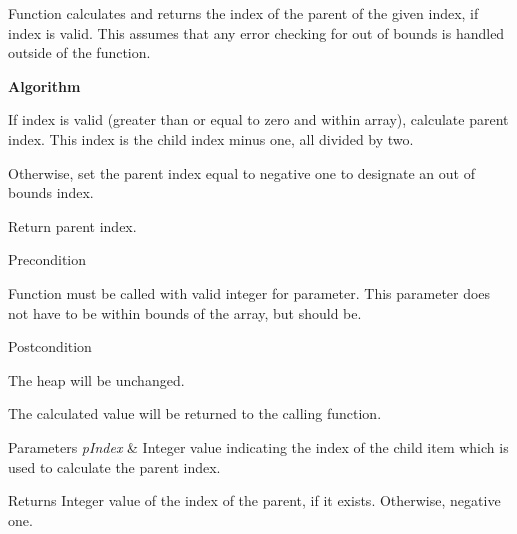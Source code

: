 \-Function calculates and returns the index of the parent of the given index, if index is valid. \-This assumes that any error checking for out of bounds is handled outside of the function.

{\bfseries \-Algorithm} 
\begin{DoxyEnumerate}
\item \-If index is valid (greater than or equal to zero and within array), calculate parent index. \-This index is the child index minus one, all divided by two.
\item \-Otherwise, set the parent index equal to negative one to designate an out of bounds index.
\item \-Return parent index.
\end{DoxyEnumerate}

\begin{DoxyPrecond}{\-Precondition}

\begin{DoxyEnumerate}
\item \-Function must be called with valid integer for parameter. \-This parameter does not have to be within bounds of the array, but should be.
\end{DoxyEnumerate}
\end{DoxyPrecond}
\begin{DoxyPostcond}{\-Postcondition}

\begin{DoxyEnumerate}
\item \-The heap will be unchanged.
\item \-The calculated value will be returned to the calling function.
\end{DoxyEnumerate}
\end{DoxyPostcond}

\begin{DoxyParams}{\-Parameters}
{\em p\-Index} & \-Integer value indicating the index of the child item which is used to calculate the parent index.\\
\hline
\end{DoxyParams}
\begin{DoxyReturn}{\-Returns}
\-Integer value of the index of the parent, if it exists. \-Otherwise, negative one.
\end{DoxyReturn}

